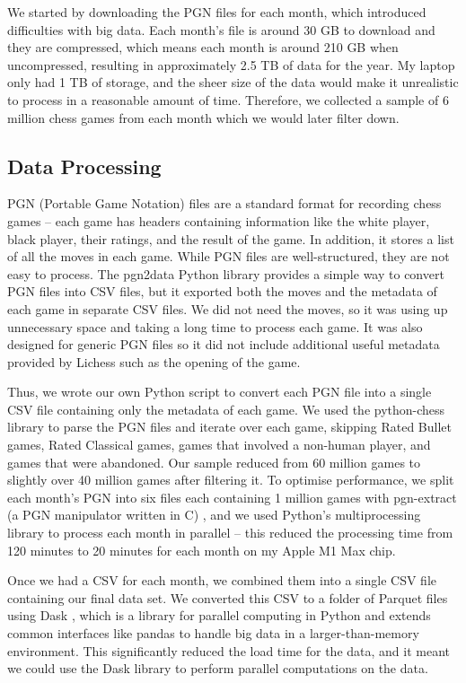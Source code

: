 \documentclass[a4paper, 11pt]{article}
\begin{document}
We started by downloading the PGN files for each month, which introduced difficulties with big data. Each month's file is around 30 GB to download and they are compressed, which means each month is around 210 GB when uncompressed, resulting in approximately 2.5 TB of data for the year. My laptop only had 1 TB of storage, and the sheer size of the data would make it unrealistic to process in a reasonable amount of time. Therefore, we collected a sample of 6 million chess games from each month which we would later filter down.

\subsection{Data Processing}
PGN (Portable Game Notation) files are a standard format for recording chess games -- each game has headers containing information like the white player, black player, their ratings, and the result of the game. In addition, it stores a list of all the moves in each game. While PGN files are well-structured, they are not easy to process. The pgn2data Python library \cite{pgn2dataGitHub} provides a simple way to convert PGN files into CSV files, but it exported both the moves and the metadata of each game in separate CSV files. We did not need the moves, so it was using up unnecessary space and taking a long time to process each game. It was also designed for generic PGN files so it did not include additional useful metadata provided by Lichess such as the opening of the game.

Thus, we wrote our own Python script to convert each PGN file into a single CSV file containing only the metadata of each game. We used the python-chess library to parse the PGN files and iterate over each game, skipping Rated Bullet games, Rated Classical games, games that involved a non-human player, and games that were abandoned. Our sample reduced from 60 million games to slightly over 40 million games after filtering it. To optimise performance, we split each month's PGN into six files each containing 1 million games with pgn-extract (a PGN manipulator written in C) \cite{pgnExtractGitHub}, and we used Python's multiprocessing library to process each month in parallel -- this reduced the processing time from 120 minutes to 20 minutes for each month on my Apple M1 Max chip.

Once we had a CSV for each month, we combined them into a single CSV file containing our final data set. We converted this CSV to a folder of Parquet files using Dask \cite{dask}, which is a library for parallel computing in Python and extends common interfaces like pandas \cite{pandas} to handle big data in a larger-than-memory environment. This significantly reduced the load time for the data, and it meant we could use the Dask library to perform parallel computations on the data.
\end{document}
